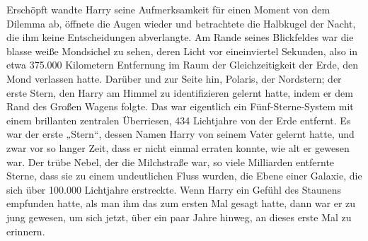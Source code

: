 Erschöpft wandte Harry seine Aufmerksamkeit für einen Moment von dem Dilemma ab, öffnete die Augen wieder und betrachtete die Halbkugel der Nacht, die ihm keine Entscheidungen abverlangte.
Am Rande seines Blickfeldes war die blasse weiße Mondsichel zu sehen, deren Licht vor eineinviertel Sekunden, also in etwa 375.000 Kilometern Entfernung im Raum der Gleichzeitigkeit der Erde, den Mond verlassen hatte.
Darüber und zur Seite hin, Polaris, der Nordstern; der erste Stern, den Harry am Himmel zu identifizieren gelernt hatte, indem er dem Rand des Großen Wagens folgte. Das war eigentlich ein Fünf-Sterne-System mit einem brillanten zentralen Überriesen, 434 Lichtjahre von der Erde entfernt. Es war der erste „Stern“, dessen Namen Harry von seinem Vater gelernt hatte, und zwar vor so langer Zeit, dass er nicht einmal erraten konnte, wie alt er gewesen war.
Der trübe Nebel, der die Milchstraße war, so viele Milliarden entfernte Sterne, dass sie zu einem undeutlichen Fluss wurden, die Ebene einer Galaxie, die sich über 100.000 Lichtjahre erstreckte. Wenn Harry ein Gefühl des Staunens empfunden hatte, als man ihm das zum ersten Mal gesagt hatte, dann war er zu jung gewesen, um sich jetzt, über ein paar Jahre hinweg, an dieses erste Mal zu erinnern.


